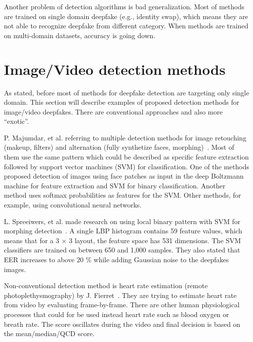 Another problem of detection algorithms is bad generalization. Most of methods are trained on single domain deepfake (e.g., identity swap), which means they are not able to recognize deepfake from different category. When methods are trained on multi-domain datasets, accuracy is going down.~\cite{FacialRetouchingAndAlterationDetection}

\section{Image/Video detection methods}

As stated, before most of methods for deepfake detection are targeting only single domain. This section will describe examples of proposed detection methods for image/video deepfakes. There are conventional approaches and also more “exotic”.

P. Majumdar, et al. referring to multiple detection methods for image retouching (makeup, filters) and alternation (fully synthetize faces, morphing)~\cite{FacialRetouchingAndAlterationDetection}. Most of them use the same pattern which could be described as specific feature extraction followed by support vector machines (SVM) for classification. One of the methods proposed detection of images using face patches as input in the deep Boltzmann machine for feature extraction and SVM for binary classification. Another method uses softmax probabilities as features for the SVM. Other methods, for example, using convolutional neural networks.~\cite{FacialRetouchingAndAlterationDetection}

L. Spreeiwers, et al. made research on using local binary pattern with SVM for morphing detection~\cite{PracticalEvaluationOfFaceMorphingAttackDetectionMethods}. A single LBP histogram contains 59 feature values, which means that for a 3 × 3 layout, the feature space has 531 dimensions. The SVM classifiers are trained on between 650 and 1,000 samples. They also stated that EER increases to above 20 \% while adding Gaussian noise to the deepfakes images.

Non-conventional detection method is heart rate estimation (remote photoplethysmography) by J. Fierret~\cite{DetectionBasedOnHeartRateEstimation}. They are trying to estimate heart rate from video by evaluating frame-by-frame. There are other human physiological processes that could for be used instead heart rate such as blood oxygen or breath rate. The score oscillates during the video and final decision is based on the mean/median/QCD score.

